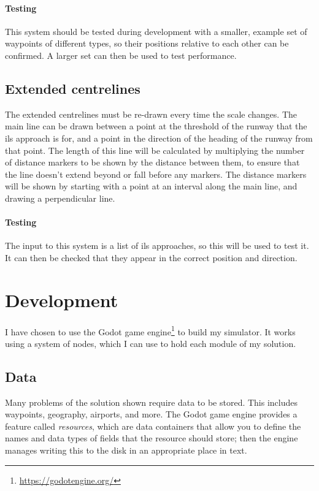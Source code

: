 \documentclass{article}
\begin{document}
\paragraph{Testing}
This system should be tested during development with a smaller, example set of waypoints of different types, so their positions relative to each other can be confirmed.
A larger set can then be used to test performance.

\subsection{Extended centrelines}
The extended centrelines must be re-drawn every time the scale changes.
The main line can be drawn between a point at the threshold of the runway that the \acrshort{ils} approach is for, and a point in the direction of the heading of the runway from that point.
The length of this line will be calculated by multiplying the number of distance markers to be shown by the distance between them, to ensure that the line doesn't extend beyond or fall before any markers.
The distance markers will be shown by starting with a point at an interval along the main line, and drawing a perpendicular line.

\paragraph{Testing}
The input to this system is a list of \acrshort{ils} approaches, so this will be used to test it.
It can then be checked that they appear in the correct position and direction.

\clearpage
\section{Development}
I have chosen to use the Godot game engine\footnote{\url{https://godotengine.org/}} to build my simulator.
It works using a system of nodes, which I can use to hold each module of my solution.


\subsection{Data}
Many problems of the solution shown require data to be stored.
This includes waypoints, geography, airports, and more.
The Godot game engine provides a feature called \textit{resources}, which are data containers that allow you to define the names and data types of fields that the resource should store; then the engine manages writing this to the disk in an appropriate place in text.
\end{document}
